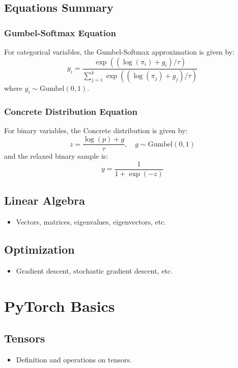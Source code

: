 \documentclass{article}
\begin{document}
\subsection{Equations Summary}

\subsubsection{Gumbel-Softmax Equation}
For categorical variables, the Gumbel-Softmax approximation is given by:
\[
y_i = \frac{\exp((\log(\pi_i) + g_i) / \tau)}{\sum_{j=1}^{k} \exp((\log(\pi_j) + g_j) / \tau)}
\]
where \( g_i \sim \text{Gumbel}(0, 1) \).

\subsubsection{Concrete Distribution Equation}
For binary variables, the Concrete distribution is given by:
\[
z = \frac{\log(p) + g}{\tau}, \quad g \sim \text{Gumbel}(0, 1)
\]
and the relaxed binary sample is:
\[
y = \frac{1}{1 + \exp(-z)}
\]
\subsection{Linear Algebra}
\begin{itemize}
    \item Vectors, matrices, eigenvalues, eigenvectors, etc.
\end{itemize}

\subsection{Optimization}
\begin{itemize}
    \item Gradient descent, stochastic gradient descent, etc.
\end{itemize}

\section{PyTorch Basics}
\label{sec:pytorch-basics}
\subsection{Tensors}
\begin{itemize}
    \item Definition and operations on tensors.
\end{itemize}
\end{document}
